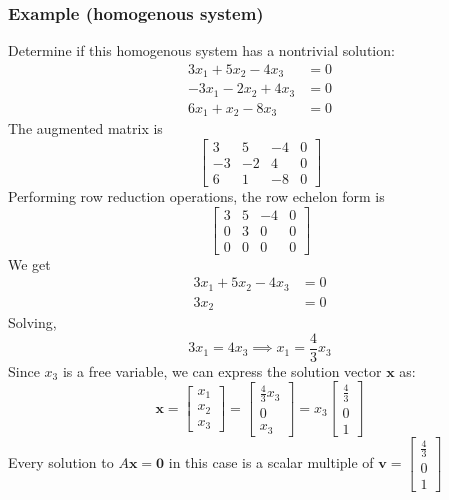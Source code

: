 \documentclass[../linear-algebra.tex]{subfiles}
\begin{document}
\subsubsection{Example (homogenous system)}
Determine if this homogenous system has a nontrivial solution:
\[
\begin{aligned}
3x_1 + 5x_2 - 4x_3 &= 0 \\
-3x_1 - 2x_2 + 4x_3 &= 0 \\
6x_1 + x_2 - 8x_3 &= 0
\end{aligned}
\]
The augmented matrix is
\[
\left[
\begin{array}{ccc|c}
3 & 5 & -4 & 0 \\
-3 & -2 & 4 & 0 \\
6 & 1 & -8 & 0
\end{array}
\right]
\]
Performing row reduction operations, the row echelon form is
\[
\left[
\begin{array}{ccc|c}
3 & 5 & -4 & 0 \\
0 & 3 & 0 & 0 \\
0 & 0 & 0 & 0
\end{array}
\right]
\]
We get
\[
\begin{aligned}
3x_1 + 5x_2 - 4x_3 &= 0 \\
3x_2 &= 0 
\end{aligned}
\]
Solving,
\[
3x_1 = 4x_3 \implies x_1 = \frac{4}{3}x_3
\]
Since $x_3$ is a free variable, we can express the solution vector $\mathbf{x}$ as:
\[
\mathbf{x} = 
\begin{bmatrix} 
x_1 \\ 
x_2 \\ 
x_3 
\end{bmatrix} 
= 
\begin{bmatrix} 
\frac{4}{3}x_3 \\ 
0 \\ 
x_3 
\end{bmatrix}
= x_3 
\begin{bmatrix} 
\frac{4}{3} \\ 
0 \\ 
1 
\end{bmatrix}
\]
Every solution to $A\mathbf{x}=\mathbf{0}$ in this case is a scalar multiple 
of $\mathbf{v}=\begin{bmatrix}
    \frac{4}{3} \\ 0 \\ 1
\end{bmatrix}$
\end{document}
